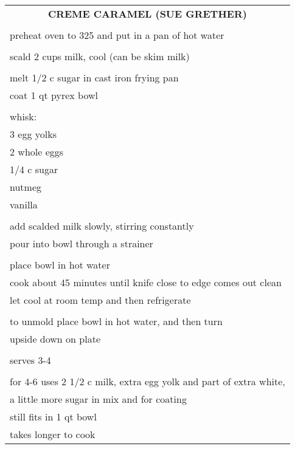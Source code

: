 \documentclass[8pt]{report}
\begin{document}
\newpage

\centering

\begin{tabular}{|l|} \hline	%
 
\multicolumn{1}{|c|}{\textbf{CREME CARAMEL (SUE GRETHER)}}
\\
\\

\index{desserts!creme caramel (sue grether)} \index{creme caramel}
\index{flan}

preheat oven to 325 and put in a pan of hot water\\
\\
scald 2 cups milk, cool (can be skim milk)\\
\\
melt 1/2 c sugar in cast iron frying pan\\
coat 1 qt pyrex bowl\\
\\
whisk:\\
\hspace{0.5 in}	3 egg yolks\\
\hspace{0.5 in}	2 whole eggs\\
\hspace{0.5 in}	1/4 c sugar\\
\hspace{0.5 in}	nutmeg\\
\hspace{0.5 in}	vanilla\\
\\
add scalded milk slowly, stirring constantly\\
pour into bowl through a strainer\\
\\
place bowl in hot water\\
cook about 45 minutes until knife close to edge comes out clean\\
let cool at room temp and then refrigerate\\
\\
to unmold place bowl in hot water, and then turn\\
upside down on plate\\
\\
serves 3-4\\
\\
for 4-6 uses 2 1/2 c milk, extra egg yolk and part of extra white,\\
a little more sugar in mix and for coating\\
still fits in 1 qt bowl\\
takes longer to cook\\

\hline

\end{tabular}
\end{document}
